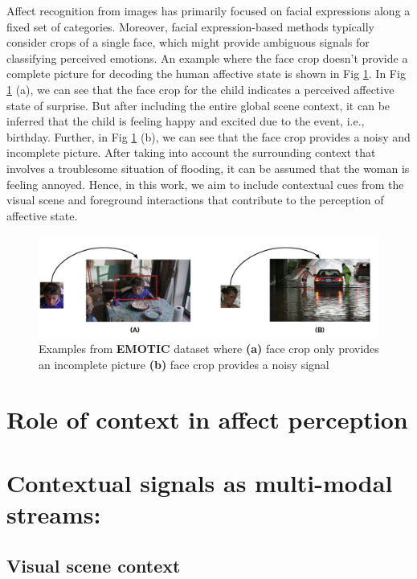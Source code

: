 Affect recognition from images has primarily focused on facial expressions \cite{DFEW,Mollahosseini2019AffectNetAD} along a fixed set of categories. Moreover, facial expression-based methods typically consider crops of a single face, which might provide ambiguous signals for classifying perceived emotions. An example where the face crop doesn't provide a complete picture for decoding the human affective state is shown in Fig \ref{face crop}. In Fig \ref{face crop} (a), we can see that the face crop for the child indicates a perceived affective state of surprise. But after including the entire global scene context, it can be inferred that the child is feeling happy and excited due to the event, i.e., birthday.
Further, in Fig \ref{face crop} (b), we can see that the face crop provides a noisy and incomplete picture. After taking into account the surrounding context that involves a troublesome situation of flooding, it can be assumed that the woman is feeling annoyed. Hence, in this work, we aim to include contextual cues from the visual scene and foreground interactions that contribute to the perception of affective state.

\begin{figure}[h!]
    \centering
    \includegraphics[width=\textwidth]{figures/face_crop_drawings.pdf}
    \caption{Examples from \textbf{EMOTIC} dataset where \textbf{(a)} face crop only provides an incomplete picture \textbf{(b)} face crop provides a noisy signal }
    \label{face crop}
\end{figure}


\section{Role of context in affect perception}
\section{Contextual signals as multi-modal streams:}
\subsection{Visual scene context}
